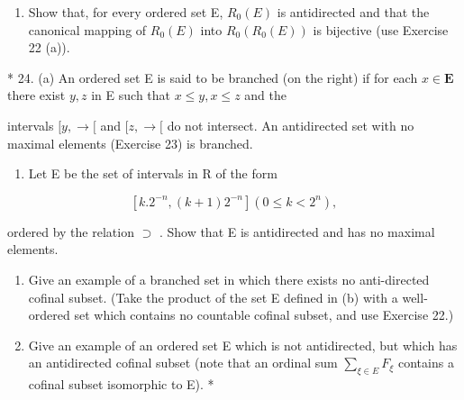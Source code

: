\begin{enumerate}
\def\labelenumi{(\alph{enumi})}
\setcounter{enumi}{2}
\tightlist
\item
  Show that, for every ordered set E, \(R_{0}(E)\) is antidirected and that the canonical mapping of \(R_{0}(E)\) into \(R_{0}(R_{0}(E))\) is bijective (use Exercise 22 (a)).
\end{enumerate}

* 24. (a) An ordered set E is said to be branched (on the right) if for each \(x \in \mathbf{E}\) there exist \(y, z\) in E such that \(x \leqslant y, x \leqslant z\) and the

intervals \([y, \rightarrow[\) and \([z, \rightarrow[\) do not intersect. An antidirected set with no maximal elements (Exercise 23) is branched.

\begin{enumerate}
\def\labelenumi{(\alph{enumi})}
\setcounter{enumi}{1}
\tightlist
\item
  Let E be the set of intervals in R of the form
\end{enumerate}

\[
[ k. 2 ^ {- n}, (k + 1) 2 ^ {- n} ] (0 \leqslant k <   2 ^ {n}),
\]

ordered by the relation \(\supset\) . Show that E is antidirected and has no maximal elements.

\begin{enumerate}
\def\labelenumi{(\alph{enumi})}
\setcounter{enumi}{2}
\item
  Give an example of a branched set in which there exists no anti-directed cofinal subset. (Take the product of the set E defined in (b) with a well-ordered set which contains no countable cofinal subset, and use Exercise 22.)
\item
  Give an example of an ordered set E which is not antidirected, but which has an antidirected cofinal subset (note that an ordinal sum \(\sum_{\xi\in E} F_{\xi}\) contains a cofinal subset isomorphic to E). *
\end{enumerate}

\exercisegroup

